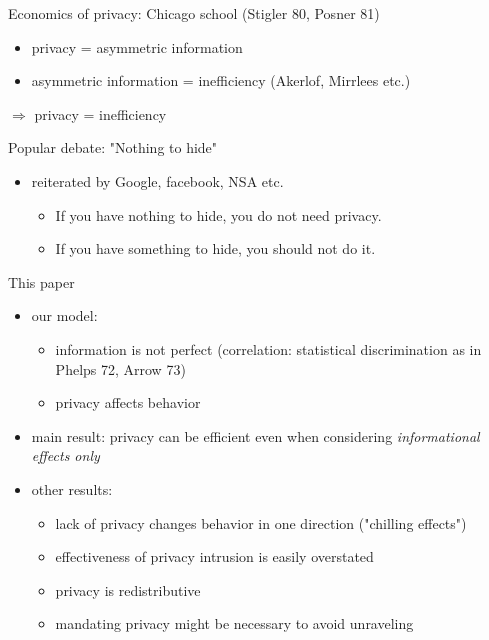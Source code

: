 \documentclass[bigger]{beamer}
\begin{document}
\begin{frame}[label={sec:org25f7efd}]{Economics of privacy: Chicago school (Stigler 80, Posner 81)}
\begin{itemize}
\item privacy = asymmetric information
\item asymmetric information = inefficiency (Akerlof, Mirrlees etc.)
\end{itemize}

\(\Rightarrow\) privacy = inefficiency 
\end{frame}

\begin{frame}[label={sec:org49d6a19}]{Popular debate: "Nothing to hide"}
\begin{itemize}
\item reiterated by Google, facebook, NSA etc.
\begin{itemize}
\item If you have nothing to hide, you do not need privacy.
\item If you have something to hide, you should not do it.
\end{itemize}
\end{itemize}
\end{frame}

\begin{frame}[label={sec:orge999e65}]{This paper}
\begin{itemize}
\item our model:
\begin{itemize}
\item information is not perfect (correlation: statistical discrimination as in Phelps 72, Arrow 73)
\item privacy affects behavior
\end{itemize}
\item main result: privacy can be efficient even when considering \emph{informational effects only}
\item other results:
\begin{itemize}
\item lack of privacy changes behavior in one direction ("chilling effects")
\item effectiveness of privacy intrusion is easily overstated
\item privacy is redistributive

\item mandating privacy might be necessary to avoid unraveling
\end{itemize}
\end{itemize}
\end{frame}
\end{document}

